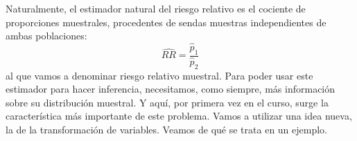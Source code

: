 Naturalmente, el estimador natural del riesgo relativo es el cociente de proporciones muestrales, procedentes de sendas muestras independientes de ambas poblaciones:
    \begin{equation}
    \label{cap09:ecu:EstimadorMuestralRiesgoRelativo}
    \widehat{RR}=\dfrac{\hat p_1}{\hat p_2}
    \end{equation}
al que vamos a denominar {\sf riesgo relativo muestral}.
Para poder usar este estimador para hacer inferencia, necesitamos, como siempre, más información sobre su distribución muestral. Y aquí, por primera vez en el curso, surge la característica más importante de este problema. Vamos a utilizar una idea nueva, la de la {\sf transformación de variables}.  Veamos de qué se trata en un ejemplo.
